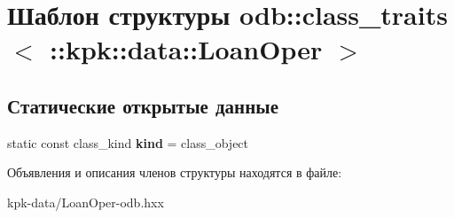 \hypertarget{structodb_1_1class__traits_3_01_1_1kpk_1_1data_1_1_loan_oper_01_4}{}\section{Шаблон структуры odb\+:\+:class\+\_\+traits$<$ \+:\+:kpk\+:\+:data\+:\+:Loan\+Oper $>$}
\label{structodb_1_1class__traits_3_01_1_1kpk_1_1data_1_1_loan_oper_01_4}
\subsection*{Статические открытые данные}
\begin{DoxyCompactItemize}
\item 
static const class\+\_\+kind {\bfseries kind} = class\+\_\+object\hypertarget{structodb_1_1class__traits_3_01_1_1kpk_1_1data_1_1_loan_oper_01_4_ad17c2900112439e42634abb6edbbe771}{}\label{structodb_1_1class__traits_3_01_1_1kpk_1_1data_1_1_loan_oper_01_4_ad17c2900112439e42634abb6edbbe771}

\end{DoxyCompactItemize}


Объявления и описания членов структуры находятся в файле\+:\begin{DoxyCompactItemize}
\item 
kpk-\/data/Loan\+Oper-\/odb.\+hxx\end{DoxyCompactItemize}

